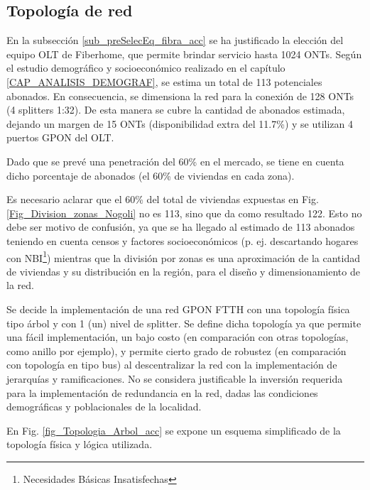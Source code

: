 \documentclass[12pt,a4paper]{book}
\begin{document}
\subsection{Topología de red}

En la subsección \ref{sub_preSelecEq_fibra_acc} se ha justificado la elección del equipo OLT de Fiberhome, que permite brindar servicio hasta 1024 ONTs. Según el estudio demográfico y
socioeconómico realizado en el capítulo \ref{CAP_ANALISIS_DEMOGRAF}, se estima un total de 113 potenciales abonados. En consecuencia, se dimensiona la red para la conexión de 128 ONTs (4
splitters 1:32). De esta manera se cubre la cantidad de abonados estimada,
dejando un margen de 15 ONTs (disponibilidad extra del 11.7\%) y se
utilizan 4 puertos GPON del OLT.\medskip

Dado que se prevé una penetración del 60\% en el mercado, se tiene en cuenta dicho porcentaje de abonados (el 60\% de viviendas en cada zona).\medskip

Es necesario aclarar que el 60\% del total de viviendas expuestas en Fig. \ref{Fig_Division_zonas_Nogoli} no es 113, sino que da como resultado 122. Esto no debe ser motivo de
confusión, ya que se ha llegado al estimado de 113 abonados teniendo en
cuenta censos y factores socioeconómicos (p. ej. descartando hogares con
NBI\footnote{Necesidades Básicas Insatisfechas}) mientras que la división por zonas es una aproximación de la cantidad de viviendas y su distribución en la región, para el diseño y
dimensionamiento de la red.\medskip

Se decide la implementación de una red GPON FTTH con una topología
física tipo árbol y con 1 (un) nivel de splitter. Se define dicha topología ya
que permite una fácil implementación, un bajo costo (en comparación con
otras topologías, como anillo por ejemplo), y permite cierto grado de
robustez (en comparación con topología en tipo bus) al descentralizar la red
con la implementación de jerarquías y ramificaciones. No se considera
justificable la inversión requerida para la implementación de redundancia en
la red, dadas las condiciones demográficas y poblacionales de la localidad.\medskip

En Fig. \ref{fig_Topologia_Arbol_acc} se expone un esquema simplificado de la topología física y lógica utilizada.
\end{document}
